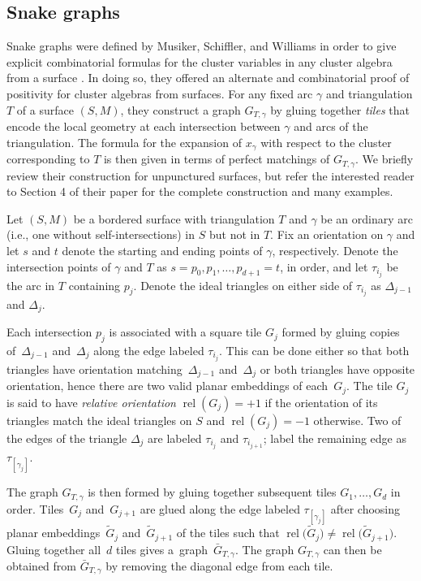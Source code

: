 \documentclass[pdftex]{sigma}%
\numberwithin{equation}{section}
\begin{document}
\subsection{Snake graphs}\label{section:snakeGraphs}

Snake graphs were defined by Musiker, Schiffler, and Williams in order to give explicit combinatorial formulas for the cluster variables in any cluster algebra from a surface \cite{MSW}. In doing so, they offered an alternate and combinatorial proof of positivity for cluster algebras from surfaces. For any fixed arc $\gamma$ and triangulation $T$ of a surface $(S,M)$, they construct a graph $G_{T,\gamma}$ by gluing together \emph{tiles} that encode the local geometry at each intersection between $\gamma$ and arcs of the triangulation. The formula for the expansion of $x_\gamma$ with respect to the cluster corresponding to $T$ is then given in terms of perfect matchings of $G_{T,\gamma}$. We briefly review their construction for unpunctured surfaces, but refer the interested reader to Section 4 of their paper for the complete construction and many examples.

Let $(S,M)$ be a bordered surface with triangulation $T$ and $\gamma$ be an ordinary arc (i.e., one without self-intersections) in $S$ but not in $T$. Fix an orientation on $\gamma$ and let $s$ and $t$ denote the starting and ending points of $\gamma$, respectively. Denote the intersection points of $\gamma$ and $T$ as $s = p_0, p_1, \dots, p_{d+1} = t$, in order, and let $\tau_{i_j}$ be the arc in $T$ containing $p_j$. Denote the ideal triangles on either side of $\tau_{i_j}$ as $\Delta_{j-1}$ and $\Delta_j$.

Each intersection $p_j$ is associated with a square tile $G_j$ formed by gluing copies of~$\Delta_{j-1}$ and~$\Delta_j$ along the edge labeled $\tau_{i_j}$. This can be done either so that both triangles have orientation matching~$\Delta_{j-1}$ and~$\Delta_j$ or both triangles have opposite orientation, hence there are two valid planar embeddings of each~$G_j$. The tile $G_j$ is said to have \emph{relative orientation} $\operatorname{rel}(G_j) = +1$ if the orientation of its triangles match the ideal triangles on $S$ and $\operatorname{rel}(G_j) = -1$ otherwise. Two of the edges of the triangle $\Delta_j$ are labeled $\tau_{i_j}$ and $\tau_{i_{j+1}}$; label the remaining edge as $\tau_{[\gamma_j]}$.

{\sloppy The graph $G_{T,\gamma}$ is then formed by gluing together subsequent tiles $G_{1}, \dots, G_{d}$ in order. Ti\-les~$G_j$ and~$G_{j+1}$ are glued along the edge labeled $\tau_{[\gamma_j]}$ after choosing planar embeddings~$\widetilde{G}_j$ and~$\widetilde{G}_{j+1}$ of the tiles such that $\operatorname{rel}\big(\widetilde{G}_j\big) \neq \operatorname{rel}\big(\widetilde{G}_{j+1}\big)$. Gluing together all~$d$ tiles gives a~graph~$\bar{G}_{T,\gamma}$. The graph $G_{T,\gamma}$ can then be obtained from $\bar{G}_{T,\gamma}$ by removing the diagonal edge from each tile.

}
\end{document}
